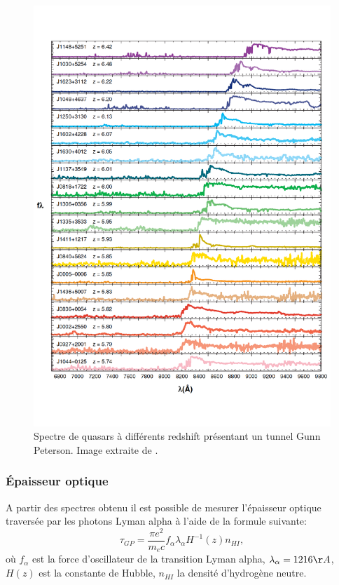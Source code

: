 \begin{figure}
        \includegraphics[width=.95\linewidth]{img/01/quasar_spectre.pdf} 
        \caption[Spectre de quasars]{Spectre de quasars à différents redshift présentant un tunnel Gunn Peterson.
		Image extraite de \cite{fan_constraining_2006}.
 		\label{fig:spectre_quasar}}
\end{figure}

\subsubsection{Épaisseur optique}

A partir des spectres obtenu il est possible de mesurer l’épaisseur optique traversée par les photons Lyman alpha à l'aide de la formule suivante:
\begin{equation}
\tau_{GP} = \frac{\pi e^2}{m_e c} f_\alpha \lambda_\alpha H^{-1}(z) n_{HI},
\end{equation}
où $f_\alpha$ est la force d'oscillateur de la transition Lyman alpha, $\lambda_\alpha = 1216 \AA$, $H(z)$ est la constante de Hubble, $n_{HI}$ la densité d'hydrogène neutre.


